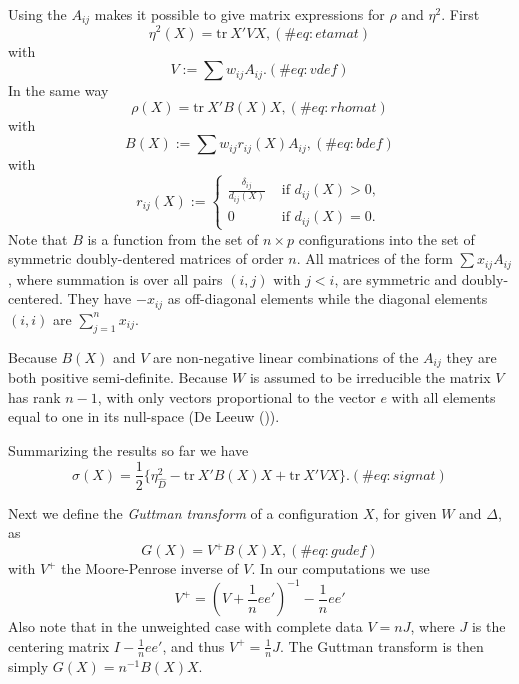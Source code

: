 \documentclass[
  12pt,
  letterpaper,
  DIV=11,
  numbers=noendperiod]{scrartcl}
\begin{document}
Using the \(A_{ij}\) makes it possible to give matrix expressions for
\(\rho\) and \(\eta^2\). First \begin{equation}
\eta^2(X)=\text{tr}\ X'VX,
(\#eq:etamat)
\end{equation} with \begin{equation}
V:=\sum   w_{ij}A_{ij}.
(\#eq:vdef)
\end{equation} In the same way \begin{equation}
\rho(X)=\text{tr}\ X'B(X)X,
(\#eq:rhomat)
\end{equation} with \begin{equation}
B(X):=\sum   w_{ij}r_{ij}(X)A_{ij},
(\#eq:bdef)
\end{equation} with \begin{equation}
r_{ij}(X):=\begin{cases}\frac{\delta_{ij}}{d_{ij}(X)}&\text{ if }d_{ij}(X)>0,\\
0&\text{ if }d_{ij}(X)=0.
\end{cases}
\end{equation} Note that \(B\) is a function from the set of
\(n\times p\) configurations into the set of symmetric doubly-dentered
matrices of order \(n\). All matrices of the form \(\sum x_{ij}A_{ij}\),
where summation is over all pairs \((i,j)\) with \(j<i\), are symmetric
and doubly-centered. They have \(-x_{ij}\) as off-diagonal elements
while the diagonal elements \((i,i)\) are \(\sum_{j=1}^nx_{ij}\).

Because \(B(X)\) and \(V\) are non-negative linear combinations of the
\(A_{ij}\) they are both positive semi-definite. Because \(W\) is
assumed to be irreducible the matrix \(V\) has rank \(n-1\), with only
vectors proportional to the vector \(e\) with all elements equal to one
in its null-space (De Leeuw ()).

Summarizing the results so far we have \begin{equation}
\sigma(X)=\frac12\{\eta_{\hat D}^2-\text{tr}\ X'B(X)X+\text{tr}\ X'VX\}.
(\#eq:sigmat)
\end{equation}

Next we define the \emph{Guttman transform} of a configuration \(X\),
for given \(W\) and \(\Delta\), as \begin{equation}
G(X)=V^+B(X)X,
(\#eq:gudef)
\end{equation} with \(V^+\) the Moore-Penrose inverse of \(V\). In our
computations we use \begin{equation}
V^+=(V+\frac{1}{n}ee')^{-1}-\frac{1}{n}ee'
\end{equation} Also note that in the unweighted case with complete data
\(V=nJ\), where \(J\) is the centering matrix \(I-\frac{1}{n}ee'\), and
thus \(V^+=\frac{1}{n}J\). The Guttman transform is then simply
\(G(X)=n^{-1}B(X)X\).
\end{document}
